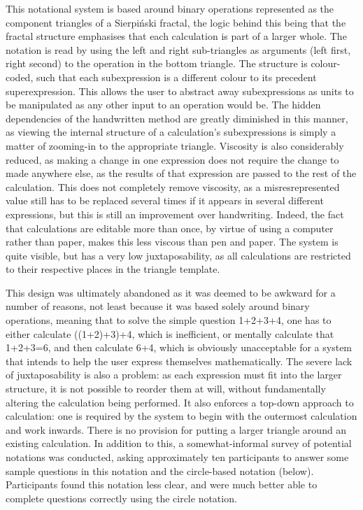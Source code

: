 \documentclass[12pt,twoside,notitlepage,xetex]{report}
\begin{document}
This notational system is based around binary operations represented as the
component triangles of a Sierpiński fractal, the logic behind this being that
the fractal structure emphasises that each calculation is part of a larger
whole.  The notation is read by using the left and right sub-triangles as
arguments (left first, right second) to the operation in the bottom triangle.
The structure is colour-coded, such that each subexpression is a different
colour to its precedent superexpression.  This allows the user to abstract away
subexpressions as units to be manipulated as any other input to an operation
would be.  The hidden dependencies of the handwritten method are greatly
diminished in this manner, as viewing the internal structure of a
calculation's subexpressions is simply a matter of zooming-in to the
appropriate triangle.  Viscosity is also considerably reduced, as making a
change in one expression does not require the change to made anywhere else, as
the results of that expression are passed to the rest of the calculation.  This
does not completely remove viscosity, as a misresrepresented value still has to
be replaced several times if it appears in several different expressions, but
this is still an improvement over handwriting.  Indeed, the fact that
calculations are editable more than once, by virtue of using a computer rather
than paper, makes this less viscous than pen and paper.  The system is quite
visible, but has a very low juxtaposability, as all calculations are restricted
to their respective places in the triangle template.

This design was ultimately abandoned as it was deemed to be awkward for a
number of reasons, not least because it was based solely around binary
operations, meaning that to solve the simple question 1+2+3+4, one has to either
calculate ((1+2)+3)+4, which is inefficient, or mentally calculate that
1+2+3=6, and then calculate 6+4, which is obviously unacceptable for a system
that intends to help the user express themselves mathematically.  The severe
lack of juxtaposability is also a problem: as each expression must fit into the
larger structure, it is not possible to reorder them at will, without
fundamentally altering the calculation being performed.  It also enforces a
top-down approach to calculation: one is required by the system to begin with the
outermost calculation and work inwards.  There is no provision for putting a
larger triangle around an existing calculation.  In addition to this, a
somewhat-informal survey of potential notations was conducted, asking
approximately ten participants to answer some sample questions in this notation and
the circle-based notation (below).  Participants found this notation less clear,
and were much better able to complete questions correctly using the circle
notation.
\end{document}
